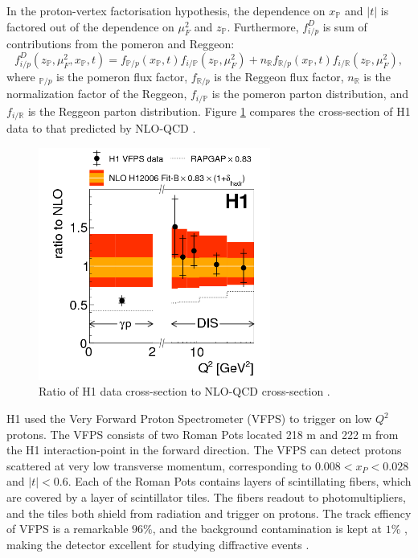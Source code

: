 In the proton-vertex factorisation hypothesis, the dependence on $x_{\mathbb{P}}$ and $|t|$ is factored out of the dependence on $\mu^2_F$ and $z_{\mathbb{P}}$. Furthermore, $f^D_{i/p}$ is sum of contributions from the pomeron and Reggeon:
\begin{equation}
f^D_{i/p}(z_{\mathbb{P}},\mu^2_F,x_{\mathbb{P}},t) = f_{\mathbb{P}/p}(x_{\mathbb{P}},t)f_{i/\mathbb{P}}(z_{\mathbb{P}},\mu^2_F) + n_\mathbb{R}f_{\mathbb{R}/p}(x_{\mathbb{P}},t)f_{i/\mathbb{R}}(z_{\mathbb{P}},
\mu^2_F) ,
\end{equation}
where $_{\mathbb{P}/p}$ is the pomeron flux factor, $f_{\mathbb{R}/p}$ is the Reggeon flux factor, $n_\mathbb{R}$ is the normalization factor of the Reggeon, $f_{i/\mathbb{P}}$ is the pomeron parton distribution, and $f_{i/\mathbb{R}}$ is the Reggeon parton distribution. Figure \ref{fig:h1Ratio} compares the cross-section of H1 data to that predicted by NLO-QCD \cite{Andreev:2015cwa}.

\begin{figure}[h!]
\begin{centering}
\includegraphics[width=3in]{Chapter1/importfigs/fig8_h1_2015.png}
\par\end{centering}
\caption{Ratio of H1 data cross-section to NLO-QCD cross-section \cite{Andreev:2015cwa}. \label{fig:h1Ratio}}
\end{figure}

H1 used the Very Forward Proton Spectrometer (VFPS) to trigger on low $Q^2$ protons. The VFPS consists of two Roman Pots located 218 m and 222 m from the H1 interaction-point in the forward direction. The VFPS can detect protons scattered at very low transverse momentum, corresponding to $0.008 < x_{P} < 0.028$ and $|t|<0.6$. Each of the Roman Pots contains layers of scintillating fibers, which are covered by a layer of scintillator tiles. The fibers readout to photomultipliers, and the tiles both shield from radiation and trigger on protons. The track effiency of VFPS is a remarkable $96 \%$, and the background contamination is kept at $1 \%$ , making the detector excellent for studying diffractive events \cite{Andreev:2015cwa}.

